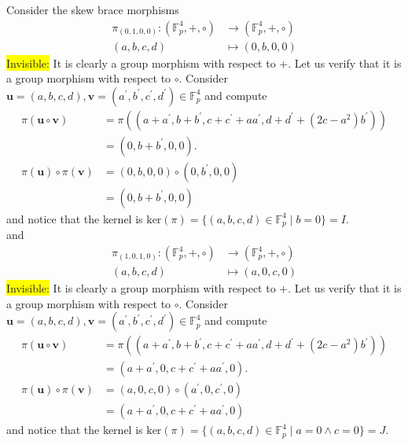 \documentclass{amsart}
\theoremstyle{definition}
\newenvironment{invisible}{{\noindent\sc \colorbox{yellow}{Invisible:}\;}\color{gray}}{\medskip}
\begin{document}
Consider the skew brace morphisms
\begin{align*}
    \pi_{(0,1,0,0)}: (\mathbb{F}^4_p,+,\circ) &\longrightarrow (\mathbb{F}^4_p,+,\circ)\\
    (a,b,c,d) &\longmapsto (0,b,0,0)
\end{align*}
\begin{invisible}
    It is clearly a group morphism with respect to +. Let us verify that it is a group morphism with respect to $\circ$. Consider $\mathbf{u}=(a,b,c,d),\mathbf{v}=(a^\prime,b^\prime,c^\prime,d^\prime) \in \mathbb{F}^4_p$ and compute
    \begin{align*}
    \pi(\mathbf{u} \circ \mathbf{v}) &= \pi ((a+a^\prime, b+b^\prime,c+c^\prime+aa^\prime,d+d^\prime+(2c-a^2)b^\prime)) \\
    &= (0, b+b^\prime,0,0).\\
    \pi(\mathbf{u}) \circ \pi(\mathbf{v}) &= (0,b,0,0) \circ (0,b^\prime,0,0) \\
    &= (0, b+b^\prime,0,0) 
    \end{align*}
    and notice that the kernel is $\mathrm{ker}(\pi) = \{(a,b,c,d) \in \mathbb{F}^4_p \mid b=0\}=I$.\\
\end{invisible}
and
\begin{align*}
    \pi_{(1,0,1,0)}: (\mathbb{F}^4_p,+,\circ) &\longrightarrow (\mathbb{F}^4_p,+,\circ)\\
    (a,b,c,d) &\longmapsto (a,0,c,0)
\end{align*}
\begin{invisible}
    It is clearly a group morphism with respect to +. Let us verify that it is a group morphism with respect to $\circ$. Consider $\mathbf{u}=(a,b,c,d),\mathbf{v}=(a^\prime,b^\prime,c^\prime,d^\prime) \in \mathbb{F}^4_p$ and compute
    \begin{align*}
    \pi(\mathbf{u} \circ \mathbf{v}) &= \pi ((a+a^\prime, b+b^\prime,c+c^\prime+aa^\prime,d+d^\prime+(2c-a^2)b^\prime)) \\
    &= (a+a^\prime, 0,c+c^\prime + aa^\prime,0).\\
    \pi(\mathbf{u}) \circ \pi(\mathbf{v}) &= (a,0,c,0) \circ (a^\prime,0,c^\prime,0) \\
    &= (a+a^\prime, 0,c+c^\prime + aa^\prime,0)
    \end{align*}
    and notice that the kernel is $\mathrm{ker}(\pi) = \{(a,b,c,d) \in \mathbb{F}^4_p \mid a=0 \land c=0\}=J$.\\
\end{invisible}
\end{document}
